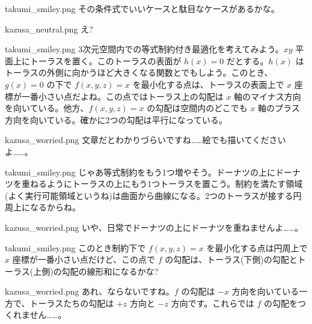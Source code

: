 \documentclass[b5paper,xelatex,ja=standard,10pt]{bxjsarticle}
\begin{document}
\begin{SERIFU}[colback=PaleGold, colbacktitle=PaleGold2]{takumi_smiley.png}
その条件式でいいケースと駄目なケースがあるかな。
\end{SERIFU}

\begin{SERIFU}[colback=PaleIris, colbacktitle=PaleIris2]{kazusa_neutral.png}
え?
\end{SERIFU}

\begin{SERIFU}[colback=PaleGold, colbacktitle=PaleGold2]{takumi_smiley.png}
3次元空間内での等式制約付き最適化を考えてみよう。$xy$ 平面上にトーラスを置く。このトーラスの表面が $h(x)=0$ だとする。$h(x)$ はトーラスの外側に向かうほど大きくなる関数とでもしよう。このとき、$g(x)=0$ の下で $f(x, y, z) = x$ を最小化する点は、トーラスの表面上で $x$ 座標が一番小さい点だよね。この点ではトーラス上の勾配は $x$ 軸のマイナス方向を向いている。他方、$f(x, y, z) = x$ の勾配は空間内のどこでも $x$ 軸のプラス方向を向いている。確かに2つの勾配は平行になっている。
\end{SERIFU}

\begin{SERIFU}[colback=PaleIris, colbacktitle=PaleIris2]{kazusa_worried.png}
文章だとわかりづらいですね……絵でも描いてくださいよ……。
\end{SERIFU}

\begin{SERIFU}[colback=PaleGold, colbacktitle=PaleGold2]{takumi_smiley.png}
じゃあ等式制約をもう1つ増やそう。ドーナツの上にドーナツを重ねるようにトーラスの上にもう1つトーラスを置こう。制約を満たす領域(よく実行可能領域というね)は曲面から曲線になる。2つのトーラスが接する円周上になるからね。
\end{SERIFU}

\begin{SERIFU}[colback=PaleIris, colbacktitle=PaleIris2]{kazusa_worried.png}
いや、日常でドーナツの上にドーナツを重ねませんよ……。
\end{SERIFU}

\begin{SERIFU}[colback=PaleGold, colbacktitle=PaleGold2]{takumi_smiley.png}
このとき制約下で $f(x, y, z)=x$ を最小化する点は円周上で $x$ 座標が一番小さい点だけど、この点で $f$ の勾配は、トーラス(下側)の勾配とトーラス(上側)の勾配の線形和になるかな?
\end{SERIFU}

\begin{SERIFU}[colback=PaleIris, colbacktitle=PaleIris2]{kazusa_worried.png}
あれ、ならないですね。$f$ の勾配は $-x$ 方向を向いている一方で、トーラスたちの勾配は $+z$ 方向と $-z$ 方向です。これらでは $f$ の勾配をつくれません……。
\end{SERIFU}
\end{document}
